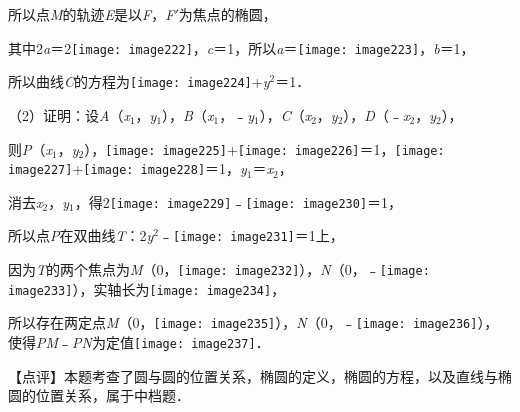 \documentclass[a4paper,11pt,UTF8,twoside]{ctexart} %
\begin{document}
所以点\textit{M}的轨迹\textit{E}是以\textit{F}，\textit{F}$\mathrm{\prime}$为焦点的椭圆，

其中2\textit{a}＝2\texttt{[image: image222]}，\textit{c}＝1，所以\textit{a}＝\texttt{[image: image223]}，\textit{b}＝1，

所以曲线\textit{C}的方程为\texttt{[image: image224]}+\textit{y}${}^{2}$＝1．

（2）证明：设\textit{A}（\textit{x}${}_{1}$，\textit{y}${}_{1}$），\textit{B}（\textit{x}${}_{1}$，﹣\textit{y}${}_{1}$），\textit{C}（\textit{x}${}_{2}$，\textit{y}${}_{2}$），\textit{D}（﹣\textit{x}${}_{2}$，\textit{y}${}_{2}$），

则\textit{P}（\textit{x}${}_{1}$，\textit{y}${}_{2}$），\texttt{[image: image225]}+\texttt{[image: image226]}＝1，\texttt{[image: image227]}+\texttt{[image: image228]}＝1，{\textbar}\textit{y}${}_{1}${\textbar}＝{\textbar}\textit{x}${}_{2}${\textbar}，

消去\textit{x}${}_{2}$，\textit{y}${}_{1}$，得2\texttt{[image: image229]}﹣\texttt{[image: image230]}＝1，

所以点\textit{P}在双曲线\textit{T}：2\textit{y}${}^{2}$﹣\texttt{[image: image231]}＝1上，

因为\textit{T}的两个焦点为\textit{M}（0，\texttt{[image: image232]}），\textit{N}（0，﹣\texttt{[image: image233]}），实轴长为\texttt{[image: image234]}，

所以存在两定点\textit{M}（0，\texttt{[image: image235]}），\textit{N}（0，﹣\texttt{[image: image236]}），使得{\textbar}{\textbar}\textit{PM}{\textbar}﹣{\textbar}\textit{PN}{\textbar}{\textbar}为定值\texttt{[image: image237]}．

【点评】本题考查了圆与圆的位置关系，椭圆的定义，椭圆的方程，以及直线与椭圆的位置关系，属于中档题．
\end{document}
